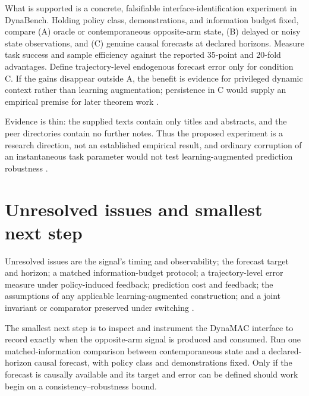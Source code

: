 \documentclass{article}
\begin{document}
What is supported is a concrete, falsifiable interface-identification experiment in DynaBench.  Holding policy class, demonstrations, and information budget fixed, compare (A) oracle or contemporaneous opposite-arm state, (B) delayed or noisy state observations, and (C) genuine causal forecasts at declared horizons.  Measure task success and sample efficiency against the reported 35-point and 20-fold advantages.  Define trajectory-level endogenous forecast error only for condition C.  If the gains disappear outside A, the benefit is evidence for privileged dynamic context rather than learning augmentation; persistence in C would supply an empirical premise for later theorem work .

Evidence is thin: the supplied texts contain only titles and abstracts, and the peer directories contain no further notes.  Thus the proposed experiment is a research direction, not an established empirical result, and ordinary corruption of an instantaneous task parameter would not test learning-augmented prediction robustness .

\section{Unresolved issues and smallest next step}

Unresolved issues are the signal's timing and observability; the forecast target and horizon; a matched information-budget protocol; a trajectory-level error measure under policy-induced feedback; prediction cost and feedback; the assumptions of any applicable learning-augmented construction; and a joint invariant or comparator preserved under switching .

The smallest next step is to inspect and instrument the DynaMAC interface to record exactly when the opposite-arm signal is produced and consumed.  Run one matched-information comparison between contemporaneous state and a declared-horizon causal forecast, with policy class and demonstrations fixed.  Only if the forecast is causally available and its target and error can be defined should work begin on a consistency--robustness bound.
\end{document}
